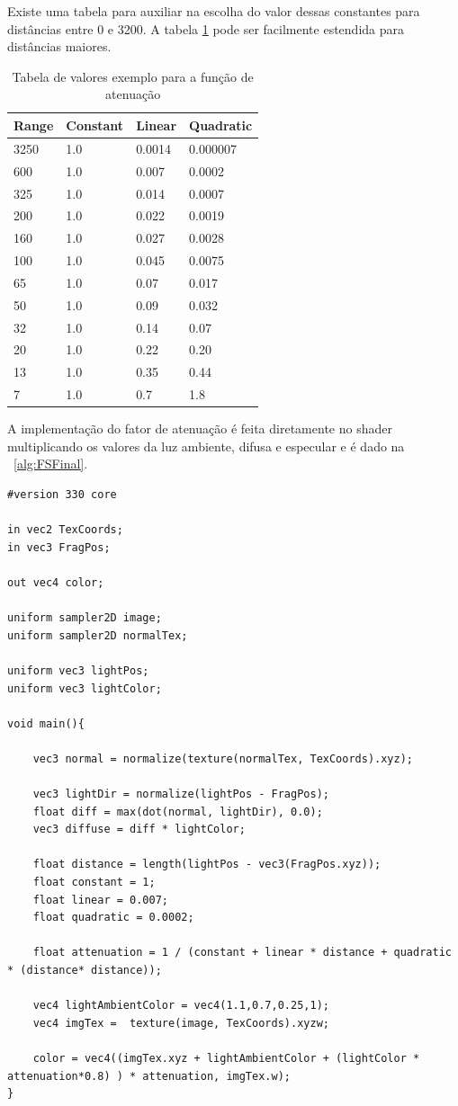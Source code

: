 \documentclass[12pt, 
openright, 
oneside, 
a4paper,    
brazil]{facom-ufu-abntex2}
\begin{document}
Existe uma tabela para auxiliar na escolha do valor dessas constantes para distâncias entre 0 e 3200. A tabela \ref{tab:attenuationValues} pode ser facilmente estendida para distâncias maiores.


\begin{table}[H]
\centering

\begin{tabular}{l l l l}
Range & Constant & Linear & Quadratic \\
\hline		
3250 & 1.0 & 0.0014 & 0.000007 \\
600 & 1.0 & 0.007 & 0.0002 \\
325 & 1.0 & 0.014 & 0.0007 \\
200 & 1.0 & 0.022 & 0.0019 \\
160 & 1.0 & 0.027 & 0.0028 \\
100 & 1.0 & 0.045 & 0.0075 \\
65 & 1.0 & 0.07 & 0.017 \\
50 & 1.0 & 0.09 & 0.032 \\
32 & 1.0 & 0.14 & 0.07 \\
20 & 1.0 & 0.22 & 0.20 \\
13 & 1.0 & 0.35 & 0.44 \\
7 & 1.0 & 0.7 & 1.8  \\

\end{tabular}
\caption{Tabela de valores exemplo para a função de atenuação}
\label{tab:attenuationValues}
\end{table}

A implementação do fator de atenuação é feita diretamente no shader multiplicando os valores da luz ambiente, difusa e especular e é dado na \lstlistingname~\ref{alg:FSFinal}.

\begin{lstlisting}[caption={Fragment Shader com luz ambiente, difusa e atenuação}, label={alg:FSFinal}
]
#version 330 core

in vec2 TexCoords;
in vec3 FragPos;  

out vec4 color;

uniform sampler2D image;
uniform sampler2D normalTex;

uniform vec3 lightPos; 
uniform vec3 lightColor;

void main(){

	vec3 normal = normalize(texture(normalTex, TexCoords).xyz);

	vec3 lightDir = normalize(lightPos - FragPos);
	float diff = max(dot(normal, lightDir), 0.0);
	vec3 diffuse = diff * lightColor;
	
	float distance = length(lightPos - vec3(FragPos.xyz));
	float constant = 1;
	float linear = 0.007;
	float quadratic = 0.0002;
	
	float attenuation = 1 / (constant + linear * distance + quadratic * (distance* distance));
	
	vec4 lightAmbientColor = vec4(1.1,0.7,0.25,1);
	vec4 imgTex =  texture(image, TexCoords).xyzw;
	
	color = vec4((imgTex.xyz + lightAmbientColor + (lightColor * attenuation*0.8) ) * attenuation, imgTex.w);
}
\end{lstlisting}
\end{document}
